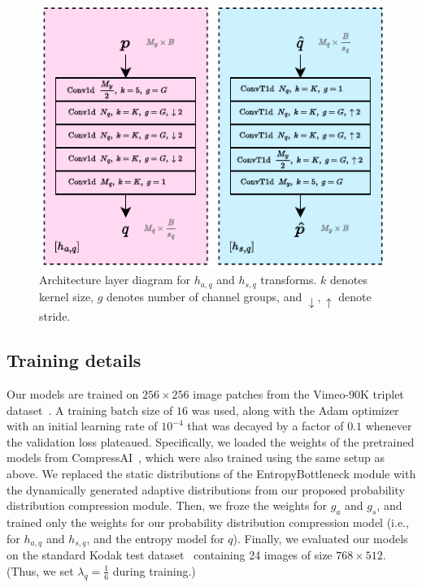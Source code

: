 \begin{figure}[htbp]
  \centering
  \includegraphics[width=0.8\linewidth]{img/pdf_compression/arch-hasq.pdf}
  \caption[Architecture layer diagram for $h_{a,q}$ and $h_{s,q}$ transforms]{%
    Architecture layer diagram for $h_{a,q}$ and $h_{s,q}$ transforms.
    $k$ denotes kernel size, $g$ denotes number of channel groups, and $\downarrow, \uparrow$ denote stride.%
  }
  \label{fig:pdf/arch-hasq}
\end{figure}




\subsection{Training details}
\label{sec:pdf_compression/experimental_setup/training_details}

Our models are trained on $256 \times 256$ image patches from the Vimeo-90K triplet dataset~\cite{xue2019video}.
A training batch size of $16$ was used, along with the Adam optimizer~\cite{kingma2014adam} with an initial learning rate of $10^{-4}$ that was decayed by a factor of $0.1$ whenever the validation loss plateaued.
Specifically, we loaded the weights of the pretrained models from CompressAI~\cite{begaint2020compressai}, which were also trained using the same setup as above.
We replaced the static distributions of the EntropyBottleneck module with the dynamically generated adaptive distributions from our proposed probability distribution compression module.
Then, we froze the weights for $g_a$ and $g_s$, and trained only the weights for our probability distribution compression model (i.e., for $h_{a,q}$ and $h_{s,q}$, and the entropy model for $q$).
Finally, we evaluated our models on the standard Kodak test dataset~\cite{kodak_dataset} containing 24 images of size $768 \times 512$.
(Thus, we set $\lambda_q = \frac{1}{6}$ during training.)




